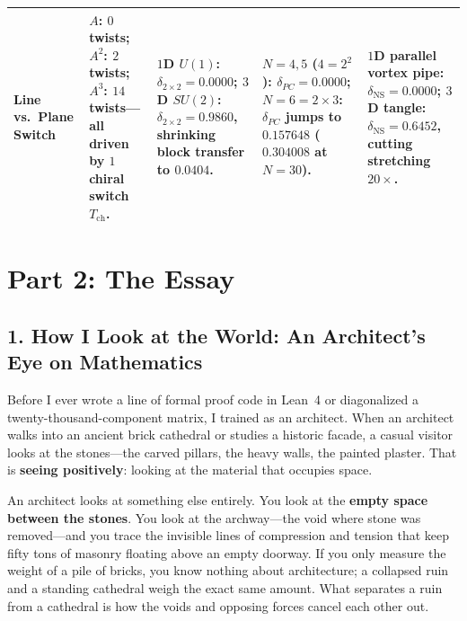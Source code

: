 \documentclass[11pt,a4paper]{article}
\begin{document}
\begin{table}[htbp]
\begin{tabular}{@{}p{2.3cm}p{3.1cm}p{3.1cm}p{3.1cm}p{3.1cm}@{}}
\addlinespace
\textbf{Line vs.\ Plane Switch} & $A$: $0$ twists; $A^2$: $2$ twists; $A^3$: $14$ twists---all driven by $1$ chiral switch $T_{\mathrm{ch}}$. & $1$D $U(1)$: $\delta_{2\times 2} = 0.0000$; $3$D $SU(2)$: $\delta_{2\times 2} = 0.9860$, shrinking block transfer to $0.0404$. & $N=4,5$ ($4=2^2$): $\delta_{PC} = 0.0000$; $N=6=2\times 3$: $\delta_{PC}$ jumps to $0.157648$ ($0.304008$ at $N=30$). & $1$D parallel vortex pipe: $\delta_{\mathrm{NS}}=0.0000$; $3$D tangle: $\delta_{\mathrm{NS}}=0.6452$, cutting stretching $20\times$. \\
\bottomrule
\end{tabular}
\end{table}

\section*{Part 2: The Essay}

\subsection*{1. How I Look at the World: An Architect's Eye on Mathematics}

Before I ever wrote a line of formal proof code in Lean~4 or diagonalized a twenty-thousand-component matrix, I trained as an architect. When an architect walks into an ancient brick cathedral or studies a historic facade, a casual visitor looks at the stones---the carved pillars, the heavy walls, the painted plaster. That is \textbf{seeing positively}: looking at the material that occupies space.

An architect looks at something else entirely. You look at the \textbf{empty space between the stones}. You look at the archway---the void where stone was removed---and you trace the invisible lines of compression and tension that keep fifty tons of masonry floating above an empty doorway. If you only measure the weight of a pile of bricks, you know nothing about architecture; a collapsed ruin and a standing cathedral weigh the exact same amount. What separates a ruin from a cathedral is how the voids and opposing forces cancel each other out.
\end{document}
